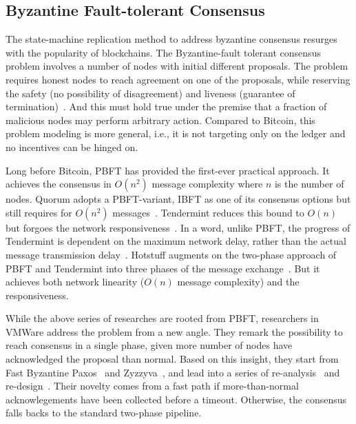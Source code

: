 \subsection{Byzantine Fault-tolerant Consensus}
The state-machine replication method to address byzantine consensus resurges with the popularity of blockchains. 
The Byzantine-fault tolerant consensus problem involves a number of nodes with initial different proposals. 
The problem requires honest nodes to reach agreement on one of the proposals, while reserving the safety (no possibility of disagreement) and liveness (guarantee of termination)~\cite{lamport2019byzantine}. 
And this must hold true under the premise that a fraction of malicious nodes may perform arbitrary action. 
Compared to Bitcoin, this problem modeling is more general, i.e., it is not targeting only on the ledger and no incentives can be hinged on. 

Long before Bitcoin, PBFT has provided the first-ever practical approach.
It achieves the consensus in $O(n^2)$ message complexity where $n$ is the number of nodes. 
Quorum adopts a PBFT-variant, IBFT as one of its consensus options but still requires for $O(n^2)$ messages~\cite{saltini2019correctness}. 
Tendermint reduces this bound to $O(n)$ but forgoes the network responsiveness~\cite{buchman2016tendermint}. 
In a word, unlike PBFT, the progress of Tendermint is dependent on the maximum network delay, rather than the actual message transmission delay~\cite{amoussou2019dissecting}. 
Hotstuff augments on the two-phase approach of PBFT and Tendermint into three phases of the message exchange~\cite{yin2019hotstuff}. 
But it achieves both network linearity ($O(n)$ message complexity) and the responsiveness. 

While the above series of researches are rooted from PBFT, researchers in VMWare address the problem from a new angle. 
They remark the possibility to reach consensus in a single phase, given more number of nodes have acknowledged the proposal than normal. 
Based on this insight, they start from Fast Byzantine Paxos~\cite{martin2006fast} and Zyzzyva~\cite{gueta2019sbft}, and lead into a series of re-analysis~\cite{abraham2017revisiting} and re-design~\cite{abraham2018revisiting, gueta2019sbft}. 
Their novelty comes from a fast path if more-than-normal acknowlegements have been collected before a timeout. 
Otherwise, the consensus falls backs to the standard two-phase pipeline.  

